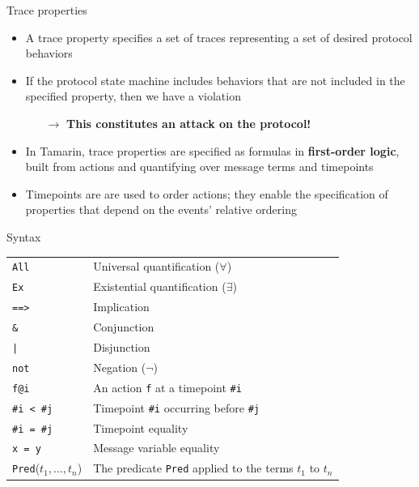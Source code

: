 \documentclass[11pt,aspectratio=169]{beamer}
\begin{document}

\begin{frame}[fragile]{Trace properties}
    \begin{itemize}
        \item A trace property specifies a set of traces representing a set of 
              desired protocol behaviors
        \item If the protocol state machine includes behaviors that are not 
              included in the specified property, then we have a violation
        \begin{itemize}
            \item[$\rightarrow$] \textbf{This constitutes an attack on the 
                                         protocol!}
        \end{itemize}
        \item In Tamarin, trace properties are specified as formulas in
              \textbf{first-order logic}, built from actions and quantifying 
              over message terms and timepoints
        \item Timepoints are are used to order actions; they enable the 
              specification of properties that depend on the events' relative 
              ordering
    \end{itemize}
\end{frame}

\begin{frame}[fragile]{Syntax}
    \begin{table}[]
        \begin{tabular}{ll}
            \texttt{All} & Universal quantification ($\forall$) \\
            \texttt{Ex}  & Existential quantification ($\exists$) \\
            \texttt{==>} & Implication \\
            \texttt{\&}  & Conjunction \\
            \texttt{|}   & Disjunction \\
            \texttt{not} & Negation ($\neg$) \\
            \texttt{f@i} & An action \texttt{f} at a timepoint \texttt{\#i} \\
            \texttt{\#i < \#j}
              & Timepoint \texttt{\#i} occurring before \texttt{\#j} \\
            \texttt{\#i = \#j} & Timepoint equality \\
            \texttt{x = y} & Message variable equality \\
            \texttt{Pred}($t_1, \dots, t_n$)
              & The predicate \texttt{Pred} applied to the terms $t_1$ to $t_n$
        \end{tabular}
    \end{table}
\end{frame}
\end{document}
